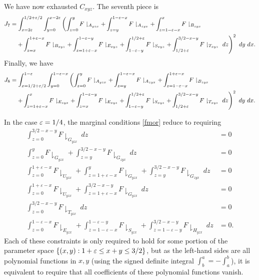 We have now exhausted $C_{xyz}$.  The seventh piece is
\begin{align*}
J_7 & = \int_{x=2\eps}^{1/2+\eps/2}\int_{y=0}^{x-2\eps} \left(\int_{z=0}^{y}F\downharpoonright_{A_{yzx}}+\int_{z=y}^{1-\eps-x}F\downharpoonright_{A_{zyx}} +\int_{z=1-\eps-x}^{x}F\downharpoonright_{B_{zyx}} \right. \\
&\quad \left. +\int_{z=x}^{1+\eps-x}F\downharpoonright_{B_{xyz}} + \int_{z=1+\eps-x}^{1-\eps-y}F\downharpoonright_{E_{xyz}} + \int_{1-\eps-y}^{1/2+\eps}F\downharpoonright_{S_{xyz}}+ \int_{1/2+\eps}^{3/2-x-y}F\downharpoonright_{T_{xyz}} \ dz \right)^{2}\ dy\ dx.
\end{align*}
Finally, we have
\begin{align*}
J_8 & = \int_{x=1/2+\eps/2}^{1-\eps}\int_{y=0}^{1-\eps-x} \left(\int_{z=0}^{y}F\downharpoonright_{A_{yzx}}+\int_{z=y}^{1-\eps-x}F\downharpoonright_{A_{zyx}} +\int_{z=1-\eps-x}^{1+\eps-x}F\downharpoonright_{B_{zyx}} \right. \\
&\quad \left. + \int_{z=1+\eps-x}^{x}F\downharpoonright_{E_{zyx}} + \int_{z=x}^{1-\eps-y}F\downharpoonright_{E_{xyz}} + \int_{1-\eps-y}^{1/2+\eps}F\downharpoonright_{S_{xyz}}+ \int_{1/2+\eps}^{3/2-x-y}F\downharpoonright_{T_{xyz}}\ dz \right)^{2}\ dy\ dx.
\end{align*}

In the case $\varepsilon=1/4$, the marginal conditions \eqref{fmor} reduce to requiring
\begin{align}
\int_{z=0}^{3/2-x-y}F\downharpoonright_{G_{yzx}}\ dz &= 0\label{m1}\\
\int_{z=0}^{y}F\downharpoonright_{G_{yzx}} +\int_{z=y}^{3/2-x-y}F\downharpoonright_{G_{zyx}}\ dz &= 0\label{m2}\\
\int_{z=0}^{1+\varepsilon-x}F\downharpoonright_{U_{yzx}} + \int_{z=1+\varepsilon-x}^{y}F\downharpoonright_{G_{yzx}} +\int_{z=y}^{3/2-x-y}F\downharpoonright_{G_{zyx}}\ dz &= 0\label{m3}\\
\int_{z=0}^{1+\varepsilon-x}F\downharpoonright_{U_{yzx}} + \int_{z=1+\varepsilon-x}^{3/2-x-y}F\downharpoonright_{G_{yzx}}\ dz &= 0\label{m4}\\
\int_{z=0}^{3/2-x-y}F\downharpoonright_{T_{yzx}}\ dz &= 0\label{m5}\\
\int_{z=0}^{1-\varepsilon-x}F\downharpoonright_{E_{yzx}} + \int_{z=1-\varepsilon-x}^{1-\varepsilon-y}F\downharpoonright_{S_{yzx}} + \int_{z=1-\varepsilon-y}^{3/2-x-y}F\downharpoonright_{H_{yzx}}\ dz &= 0.\label{m7}
\end{align}
Each of these constraints is only required to hold for some portion of the parameter space $\{ (x,y): 1+\varepsilon \leq x+y \leq 3/2 \}$, but as the left-hand sides are all polynomial functions in $x,y$ (using the signed definite integral $\int_b^a = -\int_a^b$), it is equivalent to require that all coefficients of these polynomial functions vanish.

